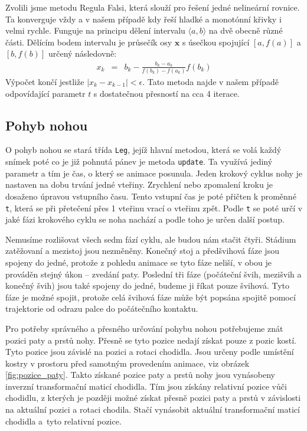 Zvolili jsme metodu Regula Falsi, která slouží pro řešení jedné nelineární rovnice. Ta konverguje vždy a v našem případě kdy řeší hladké a monotónní křivky i velmi rychle. Funguje na principu dělení intervalu $\langle a, b \rangle$ na dvě obecně různé části. Dělícím bodem intervalu je průsečík osy $\mathbf{x}$ s úsečkou spojující $[a,f(a)]$ a $[b,f(b)]$ určený následovně:
\begin{eqnarray}
x_k &=& b_k - \frac{b_k-a_k}{f(b_k)-f(a_k)}f(b_k)
\label{r.regula_falsi}
\end{eqnarray}
Výpočet končí jestliže $|x_k - x_{k-1}| < \epsilon$. Tato metoda najde v našem případě odpovídající parametr $t$ s dostatečnou přesností na cca 4 iterace.


\subsection{Pohyb nohou}
O pohyb nohou se stará třída \texttt{Leg}, jejíž hlavní metodou, která se volá každý snímek poté co je již pohnutá pánev je metoda \texttt{update}. Ta využívá jediný parametr a tím je čas, o který se animace posunula. Jeden krokový cyklus nohy je nastaven na dobu trvání jedné vteřiny. Zrychlení nebo zpomalení kroku je dosaženo úpravou vstupního času. Tento vstupní čas je poté přičten k proměnné \texttt{t}, která se při přetečení přes 1 vteřinu vrací o vteřinu zpět. Podle \texttt{t} se poté určí v jaké fázi krokového cyklu se noha nachází a podle toho je určen další postup.

Nemusíme rozlišovat všech sedm fází cyklu, ale budou nám stačit čtyři. Stádium zatěžovaní a mezistoj jsou nezměněny. Konečný stoj a předšvihová fáze jsou spojeny do jedné, protože z pohledu animace se tyto fáze neliší, v obou je prováděn stejný úkon -- zvedání paty. Poslední tři fáze (počáteční švih, mezišvih a konečný švih) jsou také spojeny do jedné, budeme ji říkat pouze švihová. Tyto fáze je možné spojit, protože celá švihová fáze může být popsána spojitě pomocí trajektorie od odrazu palce do počátečního kontaktu.

Pro potřeby správného a přesného určování pohybu nohou potřebujeme znát pozici paty a prstů nohy. Přesně se tyto pozice nedají získat pouze z pozic kostí. Tyto pozice jsou závislé na pozici a rotaci chodidla. Jsou určeny podle umístění kostry v prostoru před samotným provedením animace, viz obrázek \ref{fig:pozice_paty}. Takto získané pozice paty a prstů nohy jsou vynásobeny inverzní transformační maticí chodidla. Tím jsou získány relativní pozice vůči chodidlu, z kterých je později možné získat přesně pozici paty a prstů v závislosti na aktuální pozici a rotaci chodila. Stačí vynásobit aktuální transformační maticí chodidla a~tyto relativní pozice.

